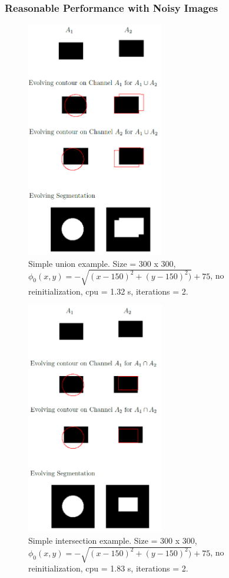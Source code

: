 \documentclass[10pt,twocolumn,letterpaper]{article}
\begin{document}
\subsubsection*{Reasonable Performance with Noisy Images}

\begin{figure}[t!]
\centering
\includegraphics[width=6cm]{sc_unionsimple.png}
\caption{Simple union example. Size = 300 x 300, $\phi_{0}(x,y) = - \sqrt{(x - 150)^2 + (y - 150)^2)} + 75$,  no reinitialization, cpu = 1.32 s, 
iterations = 2.}
\label{fig:sc_unionsimple}
\end{figure}

\begin{figure}[t!]
\centering
\includegraphics[width=6cm]{sc_intersectionsimple.png}
\caption{Simple intersection example. Size = 300 x 300, $\phi_{0}(x,y) = - \sqrt{(x - 150)^2 + (y - 150)^2)} + 75$,  no reinitialization, cpu = 1.83 s, 
iterations = 2.}
\label{fig:sc_intersectionsimple}
\end{figure}
\end{document}
